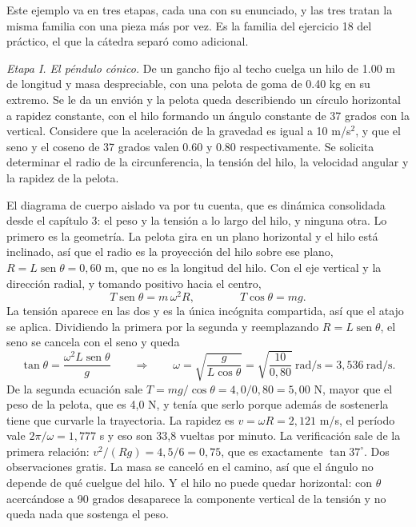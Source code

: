\documentclass[11pt,openany]{book}
\newcommand{\sen}{\operatorname{sen}}
\begin{document}
\begin{ejemplo}[completo]
Este ejemplo va en tres etapas, cada una con su enunciado, y las tres tratan la misma familia con una pieza más por vez. Es la familia del ejercicio 18 del práctico, el que la cátedra separó como adicional.

\medskip
\textit{Etapa I. El péndulo cónico.} De un gancho fijo al techo cuelga un hilo de 1.00 m de longitud y masa despreciable, con una pelota de goma de 0.40 kg en su extremo. Se le da un envión y la pelota queda describiendo un círculo horizontal a rapidez constante, con el hilo formando un ángulo constante de 37 grados con la vertical. Considere que la aceleración de la gravedad es igual a 10 m/s$^2$, y que el seno y el coseno de 37 grados valen 0.60 y 0.80 respectivamente. Se solicita determinar el radio de la circunferencia, la tensión del hilo, la velocidad angular y la rapidez de la pelota.

El diagrama de cuerpo aislado va por tu cuenta, que es dinámica consolidada desde el capítulo 3: el peso y la tensión a lo largo del hilo, y ninguna otra. Lo primero es la geometría. La pelota gira en un plano horizontal y el hilo está inclinado, así que el radio es la proyección del hilo sobre ese plano, $R = L\sen\theta = 0{,}60$ m, que no es la longitud del hilo. Con el eje vertical y la dirección radial, y tomando positivo hacia el centro,
\[
T\sen\theta = m\,\omega^2 R ,
\qquad\qquad
T\cos\theta = m g .
\]
La tensión aparece en las dos y es la única incógnita compartida, así que el atajo se aplica. Dividiendo la primera por la segunda y reemplazando $R = L\sen\theta$, el seno se cancela con el seno y queda
\[
\tan\theta = \frac{\omega^2 L\sen\theta}{g}
\qquad\Longrightarrow\qquad
\omega = \sqrt{\frac{g}{L\cos\theta}} = \sqrt{\frac{10}{0{,}80}}\ \mathrm{rad/s} = 3{,}536\ \mathrm{rad/s} .
\]
De la segunda ecuación sale $T = mg/\cos\theta = 4{,}0/0{,}80 = 5{,}00$ N, mayor que el peso de la pelota, que es 4,0 N, y tenía que serlo porque además de sostenerla tiene que curvarle la trayectoria. La rapidez es $v = \omega R = 2{,}121$ m/s, el período vale $2\pi/\omega = 1{,}777$ s y eso son 33,8 vueltas por minuto. La verificación sale de la primera relación: $v^2/(Rg) = 4{,}5/6 = 0{,}75$, que es exactamente $\tan 37^\circ$. Dos observaciones gratis. La masa se canceló en el camino, así que el ángulo no depende de qué cuelgue del hilo. Y el hilo no puede quedar horizontal: con $\theta$ acercándose a 90 grados desaparece la componente vertical de la tensión y no queda nada que sostenga el peso.


\end{ejemplo}
\end{document}
